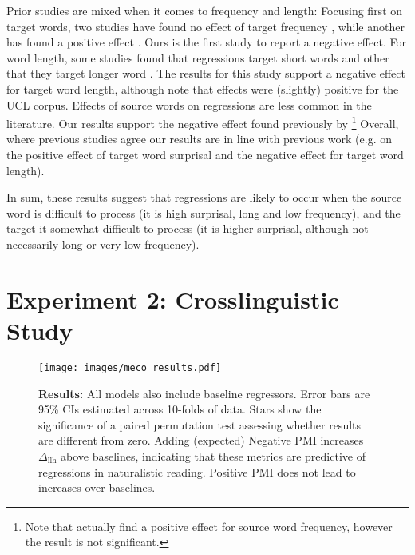\documentclass[12pt]{article}
\newcommand{\dllmath}{\Delta_{\mathrm{llh}}}
\newcommand{\dll}{$\dllmath$\xspace}
\begin{document}
Prior studies are mixed when it comes to frequency and length: Focusing first on target words, two studies have found no effect of target frequency \citep{rayner2004effects, kliegl2004length}, while another has found a positive effect \citep{bicknell2011readers}. Ours is the first study to report a negative effect. For word length, some studies found that regressions target short words \citep{kliegl2004length} and other that they target longer word \citep{vitu2000regressive, bicknell2011readers}. The results for this study support a negative effect for target word length, although note that effects were (slightly) positive for the UCL corpus. Effects of source words on regressions are less common in the literature. Our results support the negative effect found previously by \cite{lopopolo2019dependency}\footnote{Note that \citet{bicknell2011readers} actually find a positive effect for source word frequency, however the result is not significant.} Overall, where previous studies agree our results are in line with previous work (e.g. on the positive effect of target word surprisal and the negative effect for target word length).

In sum, these results suggest that regressions are likely to occur when the source word is difficult to process (it is high surprisal, long and low frequency), and the target it somewhat difficult to process (it is higher surprisal, although not necessarily long or very low frequency). 


\section{Experiment 2: Crosslinguistic Study }

\begin{figure*}[t]
    \centering
    \begin{minipage}{0.95\textwidth}
    \centering
    \small
    \texttt{[image: images/meco\_results.pdf]}
    \vspace{-0.8cm}
    \caption{ \small \textbf{Results:} All models also include baseline regressors. Error bars are 95\% CIs estimated across 10-folds of data. Stars show the significance of a paired permutation test assessing whether results are different from zero. Adding (expected) Negative PMI increases \dll above baselines, indicating that these metrics are predictive of regressions in naturalistic reading. Positive PMI does not lead to increases over baselines.}
    \label{fig:exp2-results}
    \end{minipage}
\end{figure*}
\end{document}
